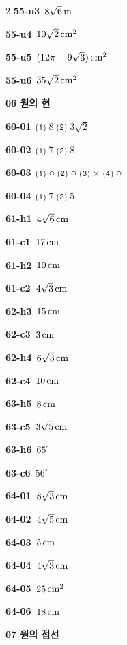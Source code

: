 \documentclass[10pt,a4paper]{article}
\begin{document}
\begin{multicols}{2}
\noindent\textbf{55-u3}\ $8\sqrt{6}\mkern3mu \mathrm{m}$\par
\noindent\textbf{55-u4}\ $10\sqrt{2}\mkern3mu \mathrm{cm}^2$\par
\noindent\textbf{55-u5}\ $(12\pi-9\sqrt{3})\mkern3mu \mathrm{cm}^2$\par
\noindent\textbf{55-u6}\ $35\sqrt{2}\mkern3mu \mathrm{cm}^2$\par
\noindent\textbf{06 원의 현}\par\smallskip
\noindent\textbf{60-01}\ ⑴ $8$ ⑵ $3\sqrt{2}$\par
\noindent\textbf{60-02}\ ⑴ $7$ ⑵ $8$\par
\noindent\textbf{60-03}\ ⑴ ○ ⑵ ○ ⑶ × ⑷ ○\par
\noindent\textbf{60-04}\ ⑴ $7$ ⑵ $5$\par
\noindent\textbf{61-h1}\ $4\sqrt{6}\mkern3mu \mathrm{cm}$\par
\noindent\textbf{61-c1}\ $17\mkern3mu \mathrm{cm}$\par
\noindent\textbf{61-h2}\ $10\mkern3mu \mathrm{cm}$\par
\noindent\textbf{61-c2}\ $4\sqrt{3}\mkern3mu \mathrm{cm}$\par
\noindent\textbf{62-h3}\ $15\mkern3mu \mathrm{cm}$\par
\noindent\textbf{62-c3}\ $3\mkern3mu \mathrm{cm}$\par
\noindent\textbf{62-h4}\ $6\sqrt{3}\mkern3mu \mathrm{cm}$\par
\noindent\textbf{62-c4}\ $10\mkern3mu \mathrm{cm}$\par
\noindent\textbf{63-h5}\ $8\mkern3mu \mathrm{cm}$\par
\noindent\textbf{63-c5}\ $3\sqrt{5}\mkern3mu \mathrm{cm}$\par
\noindent\textbf{63-h6}\ $65^\circ$\par
\noindent\textbf{63-c6}\ $56^\circ$\par
\noindent\textbf{64-01}\ $8\sqrt{3}\mkern3mu \mathrm{cm}$\par
\noindent\textbf{64-02}\ $4\sqrt{5}\mkern3mu \mathrm{cm}$\par
\noindent\textbf{64-03}\ $5\mkern3mu \mathrm{cm}$\par
\noindent\textbf{64-04}\ $4\sqrt{3}\mkern3mu \mathrm{cm}$\par
\noindent\textbf{64-05}\ $25\mkern3mu \mathrm{cm}^2$\par
\noindent\textbf{64-06}\ $18\mkern3mu \mathrm{cm}$\par
\noindent\textbf{07 원의 접선}\par\smallskip

\end{multicols}
\end{document}
